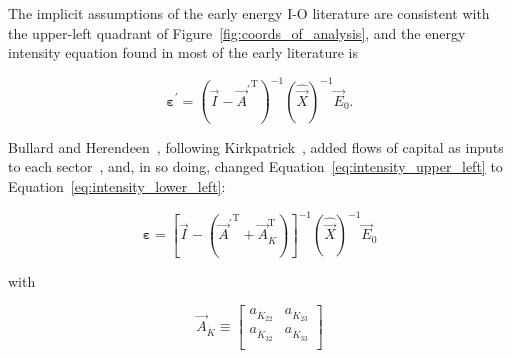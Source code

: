 % 
% 
% 
% 
% 
% 
% 
% 
The implicit assumptions of the early energy I-O literature 
are consistent with the upper-left quadrant
of Figure~\ref{fig:coords_of_analysis}, 
and the energy intensity equation
found in most of the early literature is

\begin{equation} \label{eq:intensity_upper_left}
	\boldsymbol{\varepsilon}^{'}
	= {\left( \vec{I} - {\vec{A}^{'}}^{\mathrm{T}} \right)}^{-1}
		{\left( \hat{\vec{X}} \right)}^{-1}
		\vec{E}_{0}.
\end{equation}

Bullard and Herendeen~\cite{Bullard-III:1975aa}, 
following Kirkpatrick~\cite{Kirkpatrick:1974te},
added flows of capital as inputs 
to each sector~\cite[Figure~5]{Bullard-III:1975aa},
and, in so doing, changed Equation~\ref{eq:intensity_upper_left}
to Equation~\ref{eq:intensity_lower_left}:

\begin{equation} \label{eq:intensity_lower_left}
	\boldsymbol{\varepsilon}
	= {\left[ \vec{I} - 
			\left( {\vec{A}^{'}}^{\mathrm{T}} 
					+ \vec{A}_{\dot{K}}^{\mathrm{T}} \right) \right]}^{-1}
		{\left( \hat{\vec{X}} \right)}^{-1}	\vec{E}_{0}
\end{equation}

\noindent{}with

\begin{equation}
	\vec{A}_{\dot{K}}
	\equiv
	\begin{bmatrix}
		a_{\dot{K}_{22}}	& a_{\dot{K}_{23}} \\
		a_{\dot{K}_{32}}    & a_{\dot{K}_{33}} \\
	\end{bmatrix}
\end{equation}

